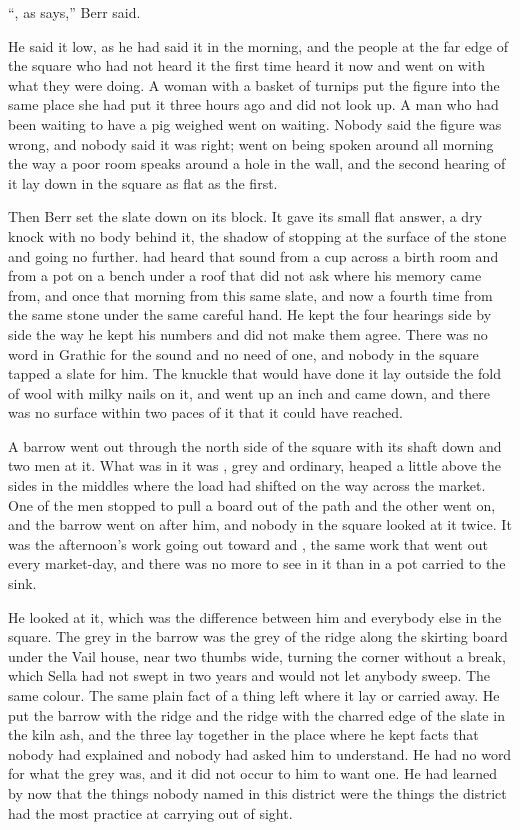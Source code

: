 “, as  says,” Berr said.

He said it low, as he had said it in the morning, and the people at the far edge of the square who had not heard it the first time heard it now and went on with what they were doing. A woman with a basket of turnips put the figure into the same place she had put it three hours ago and did not look up. A man who had been waiting to have a pig weighed went on waiting. Nobody said the figure was wrong, and nobody said it was right;  went on being spoken around all morning the way a poor room speaks around a hole in the wall, and the second hearing of it lay down in the square as flat as the first.

Then Berr set the slate down on its block. It gave its small flat answer, a dry knock with no body behind it, the shadow of  stopping at the surface of the stone and going no further.  had heard that sound from a cup across a birth room and from a pot on a bench under a roof that did not ask where his memory came from, and once that morning from this same slate, and now a fourth time from the same stone under the same careful hand. He kept the four hearings side by side the way he kept his numbers and did not make them agree. There was no word in Grathic for the sound and no need of one, and nobody in the square tapped a slate for him. The knuckle that would have done it lay outside the fold of wool with milky nails on it, and went up an inch and came down, and there was no surface within two paces of it that it could have reached.

\scenebreak

A barrow went out through the north side of the square with its shaft down and two men at it. What was in it was , grey and ordinary, heaped a little above the sides in the middles where the load had shifted on the way across the market. One of the men stopped to pull a board out of the path and the other went on, and the barrow went on after him, and nobody in the square looked at it twice. It was the afternoon's work going out toward  and , the same work that went out every market-day, and there was no more to see in it than in a pot carried to the sink.

He looked at it, which was the difference between him and everybody else in the square. The grey in the barrow was the grey of the ridge along the skirting board under the Vail house, near two thumbs wide, turning the corner without a break, which Sella had not swept in two years and would not let anybody sweep. The same colour. The same plain fact of a thing left where it lay or carried away. He put the barrow with the ridge and the ridge with the charred edge of the slate in the kiln ash, and the three lay together in the place where he kept facts that nobody had explained and nobody had asked him to understand. He had no word for what the grey was, and it did not occur to him to want one. He had learned by now that the things nobody named in this district were the things the district had the most practice at carrying out of sight.

